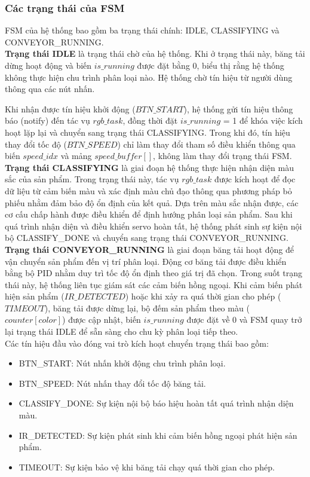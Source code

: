 \subsubsection{Các trạng thái của FSM}
FSM của hệ thống bao gồm ba trạng thái chính: IDLE, CLASSIFYING và CONVEYOR\_RUNNING.\\
\textbf{Trạng thái IDLE} là trạng thái chờ của hệ thống. Khi ở trạng thái này, băng tải dừng hoạt động và biến $is\_running$ được đặt bằng 0, biểu thị rằng hệ thống không thực hiện chu trình phân loại nào. Hệ thống chờ tín hiệu từ người dùng thông qua các nút nhấn. 

Khi nhận được tín hiệu khởi động ($BTN\_START$), hệ thống gửi tín hiệu thông báo (notify) đến tác vụ $rgb\_task$, đồng thời đặt $is\_running$ = 1 để khóa việc kích hoạt lặp lại và chuyển sang trạng thái CLASSIFYING. Trong khi đó, tín hiệu thay đổi tốc độ ($BTN\_SPEED$) chỉ làm thay đổi tham số điều khiển thông qua biến $speed\_idx$ và mảng $speed\_buffer[]$, không làm thay đổi trạng thái FSM.\\

\textbf{Trạng thái CLASSIFYING} là giai đoạn hệ thống thực hiện nhận diện màu sắc của sản phẩm. Trong trạng thái này, tác vụ $rgb\_task$ được kích hoạt để đọc dữ liệu từ cảm biến màu và xác định màu chủ đạo thông qua phương pháp bỏ phiếu nhằm đảm bảo độ ổn định của kết quả. Dựa trên màu sắc nhận được, các cơ cấu chấp hành được điều khiển để định hướng phân loại sản phẩm. Sau khi quá trình nhận diện và điều khiển servo hoàn tất, hệ thống phát sinh sự kiện nội bộ CLASSIFY\_DONE và chuyển sang trạng thái CONVEYOR\_RUNNING.\\

\textbf{Trạng thái CONVEYOR\_RUNNING} là giai đoạn băng tải hoạt động để vận chuyển sản phẩm đến vị trí phân loại. Động cơ băng tải được điều khiển bằng bộ PID nhằm duy trì tốc độ ổn định theo giá trị đã chọn. Trong suốt trạng thái này, hệ thống liên tục giám sát các cảm biến hồng ngoại. Khi cảm biến phát hiện sản phẩm ($IR\_DETECTED$) hoặc khi xảy ra quá thời gian cho phép ($TIMEOUT$), băng tải được dừng lại, bộ đếm sản phẩm theo màu ($counter[color]$) được cập nhật, biến $is\_running$ được đặt về 0 và FSM quay trở lại trạng thái IDLE để sẵn sàng cho chu kỳ phân loại tiếp theo.\\
Các tín hiệu đầu vào đóng vai trò kích hoạt chuyển trạng thái bao gồm:
\begin{itemize}
    \item BTN\_START: Nút nhấn khởi động chu trình phân loại.
    \item BTN\_SPEED: Nút nhấn thay đổi tốc độ băng tải.
    \item CLASSIFY\_DONE: Sự kiện nội bộ báo hiệu hoàn tất quá trình nhận diện màu.
    \item IR\_DETECTED: Sự kiện phát sinh khi cảm biến hồng ngoại phát hiện sản phẩm.
    \item TIMEOUT: Sự kiện bảo vệ khi băng tải chạy quá thời gian cho phép.
\end{itemize}

